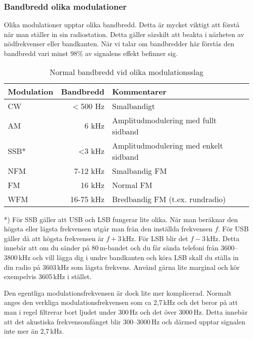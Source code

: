 \subsubsection{Bandbredd olika modulationer}

Olika modulationer upptar olika bandbredd. Detta är mycket viktigt att förstå
när man ställer in sin radiostation. Detta gäller särskilt att beakta i
närheten av nödfrekvenser eller bandkanten. När vi talar om bandbredder här
förstås den bandbredd vari minst 98\% av signalens effekt befinner sig.

\begin{table}[H]
\centering
\begin{tabular}{lrl}
	\textbf{Modulation} & \textbf{Bandbredd} & \textbf{Kommentarer}                  \\ \hline
	CW                  &          $<$500 Hz & Smalbandigt                           \\
	AM                  &              6 kHz & Amplitudmodulering med fullt sidband  \\
	SSB*                &              <3 kHz & Amplitudmodulering med enkelt sidband \\
	NFM                 &           7-12 kHz & Smalbandig FM                         \\
	FM                  &             16 kHz & Normal FM                             \\
	WFM                 &          16-75 kHz & Bredbandig FM (t.ex. rundradio)
\end{tabular}
\caption{Normal bandbredd vid olika modulationsslag}
\end{table}

*) För SSB gäller att USB och LSB fungerar lite olika. När man beräknar den
högsta eller lägsta frekvensen utgår man från den inställda frekvensen
$f$. För USB gäller då att högsta frekvensen är $f+3$\,kHz. För LSB blir det
$f-3$\,kHz. Detta innebär att om du sänder på 80\,m-bandet och du får sända
telefoni från 3600--3800\,kHz och vill lägga dig i undre bandkanten och köra
LSB skall du ställa in din radio på 3603\,kHz som lägsta frekvens. Använd
gärna lite marginal och kör exempelvis 3605\,kHz i stället.

Den egentliga modulationsfrekvensen är dock lite mer komplicerad. Normalt
anges den verkliga modulationsfrekvensen som ca 2,7\,kHz och det beror på att
man i regel filtrerar bort ljudet under 300\,Hz och det över 3000\,Hz. Detta
innebär att det akustiska frekvensomfånget blir 300--3000\,Hz och därmed
upptar signalen inte mer än 2,7\,kHz.


